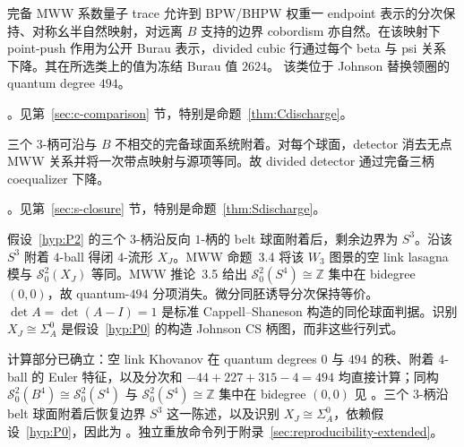 \begin{hypothesis}[系数比较，C]\label{hyp:P1}
完备 MWW 系数量子 trace 允许到 BPW/BHPW 权重一 endpoint 表示的分次保持、对称幺半自然映射，对远离 $B$ 支持的边界 cobordism 亦自然。在该映射下 point-push 作用为公开 Burau 表示，divided cubic 行通过每个 beta 与 psi 关系下降。其在所选类上的值为冻结 Burau 值 $2624$。
该类位于 Johnson 替换领圈的 quantum degree $494$。
\end{hypothesis}

\begin{remark}[C 的状态]
\Open。见第~\ref{sec:c-comparison} 节，特别是命题~\ref{thm:Cdischarge}。
\end{remark}

\begin{hypothesis}[相对三柄闭包，S]\label{hyp:P2}
三个 $3$-柄可沿与 $B$ 不相交的完备球面系统附着。对每个球面，detector 消去无点 MWW 关系并将一次带点映射与源项等同。故 divided detector 通过完备三柄 coequalizer 下降。
\end{hypothesis}

\begin{remark}[S 的状态]
\Open。见第~\ref{sec:s-closure} 节，特别是命题~\ref{thm:Sdischarge}。
\end{remark}

\begin{hypothesis}[替换图景的四柄闭包，P3]\label{hyp:P3}
假设~\ref{hyp:P2} 的三个 $3$-柄沿反向 $1$-柄的 belt 球面附着后，剩余边界为 $S^3$。沿该 $S^3$ 附着 $4$-ball 得闭 $4$-流形 $X_J$。MWW 命题~3.4 将该 $W_3$ 图景的空 link lasagna 模与 $\mathcal S^2_0(X_J)$ 等同。MWW 推论~3.5 给出 $\mathcal S^2_0(S^4)\cong\mathbb Z$ 集中在 bidegree $(0,0)$，故 quantum-$494$ 分项消失。微分同胚诱导分次保持等价。$\det A=\det(A-I)=1$ 是标准 Cappell--Shaneson 构造的同伦球面判据。识别 $X_J\cong\Sigma_A^0$ 是假设~\ref{hyp:P0} 的构造 Johnson CS 柄图，而非这些行列式。
\end{hypothesis}

\begin{remark}[P3 的状态]
计算部分已确立：空 link Khovanov 在 quantum degrees $0$ 与 $494$ 的秩、附着 $4$-ball 的 Euler 特征，以及分次和 $-44+227+315-4=494$ 均直接计算；同构 $\mathcal S^2_0(B^4)\cong\mathcal S^2_0(S^4)$ 与 $\mathcal S^2_0(S^4)\cong\mathbb Z$ 集中在 bidegree $(0,0)$ 见 \cite[Proposition~3.4 and Corollary~3.5]{ManolescuWalkerWedrich2023}。三个 $3$-柄沿 belt 球面附着后恢复边界 $S^3$ 这一陈述，以及识别 $X_J\cong\Sigma_A^0$，依赖假设~\ref{hyp:P0}，因此为 \Open。独立重放命令列于附录~\ref{sec:reproducibility-extended}。
\end{remark}


